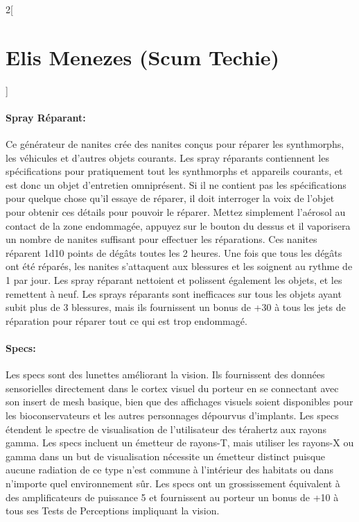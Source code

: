 \documentclass[a4paper,9pt]{article}
\begin{document}
\begin{multicols}{2}[\section*{Elis Menezes (Scum Techie)}]
   \paragraph{Spray Réparant:} Ce générateur de nanites crée des nanites conçus
   pour réparer les synthmorphs, les véhicules et d'autres objets courants. Les
   spray réparants contiennent les spécifications pour pratiquement tout les
   synthmorphs et appareils courants, et est donc un objet d'entretien
   omniprésent. Si il ne contient pas les spécifications pour quelque chose
   qu'il essaye de réparer, il doit interroger la voix de l'objet pour obtenir
   ces détails pour pouvoir le réparer. Mettez simplement l'aérosol au contact
   de la zone endommagée, appuyez sur le bouton du dessus et il vaporisera un
   nombre de nanites suffisant pour effectuer les réparations. Ces nanites
   réparent 1d10 points de dégâts toutes les 2 heures. Une fois que tous les
   dégâts ont été réparés, les nanites s'attaquent aux blessures et les
   soignent au rythme de 1 par jour. Les spray réparant nettoient et polissent
   également les objets, et les remettent à neuf. Les sprays réparants sont
   inefficaces sur tous les objets ayant subit plus de 3 blessures, mais ils
   fournissent un bonus de +30 à tous les jets de réparation pour réparer tout
   ce qui est trop endommagé.

   \paragraph{Specs:} Les specs sont des lunettes améliorant la vision. Ils
   fournissent des données sensorielles directement dans le cortex visuel du
   porteur en se connectant avec son insert de mesh basique, bien que des
   affichages visuels soient disponibles pour les bioconservateurs et les
   autres personnages dépourvus d'implants. Les specs étendent le spectre de
   visualisation de l'utilisateur des térahertz aux rayons gamma. Les specs
   incluent un émetteur de rayons-T, mais utiliser les rayons-X ou gamma dans
   un but de visualisation nécessite un émetteur distinct puisque aucune
   radiation de ce type n'est commune à l'intérieur des habitats ou dans
   n'importe quel environnement sûr. Les specs ont un grossissement équivalent
   à des amplificateurs de puissance 5 et fournissent au porteur un bonus de
   +10 à tous ses Tests de Perceptions impliquant la vision.

\end{multicols}
\end{document}

